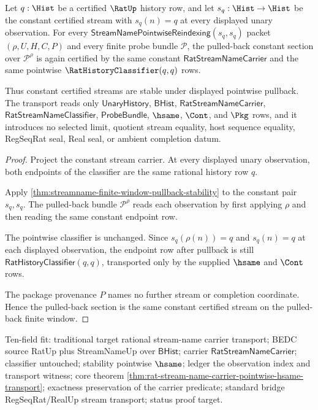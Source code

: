 \begin{theorem}
\label{thm:streamname-constant-section-transport}
Let $q:\Hist$ be a certified $\RatUp$ history row, and let $s_q:\Hist\to\Hist$ be the constant certified stream with $s_q(n)=q$ at every displayed unary observation. For every $\mathsf{StreamNamePointwiseReindexing}(s_q,s_q)$ packet $(\rho,U,H,C,P)$ and every finite probe bundle $\mathcal{P}$, the pulled-back constant section over $\mathcal{P}^{\rho}$ is again certified by the same constant $\mathsf{RatStreamNameCarrier}$ and the same pointwise $\RatHistoryClassifier(q,q)$ rows.

Thus constant certified streams are stable under displayed pointwise pullback. The transport reads only $\mathsf{UnaryHistory}$, $\mathsf{BHist}$, $\mathsf{RatStreamNameCarrier}$, $\mathsf{RatStreamNameClassifier}$, $\mathsf{ProbeBundle}$, $\hsame$, $\Cont$, and $\Pkg$ rows, and it introduces no selected limit, quotient stream equality, host sequence equality, RegSeqRat seal, Real seal, or ambient completion datum.
\end{theorem}
\begin{proof}
Project the constant stream carrier. At every displayed unary observation, both endpoints of the classifier are the same rational history row $q$.

Apply \autoref{thm:streamname-finite-window-pullback-stability} to the constant pair $s_q,s_q$. The pulled-back bundle $\mathcal{P}^{\rho}$ reads each observation by first applying $\rho$ and then reading the same constant endpoint row.

The pointwise classifier is unchanged. Since $s_q(\rho(n))=q$ and $s_q(n)=q$ at each displayed observation, the endpoint row after pullback is still $\mathsf{RatHistoryClassifier}(q,q)$, transported only by the supplied $\hsame$ and $\Cont$ rows.

The package provenance $P$ names no further stream or completion coordinate. Hence the pulled-back section is the same constant certified stream on the pulled-back finite window.
\end{proof}

Ten-field fit: traditional target rational stream-name carrier transport; BEDC
source RatUp plus StreamNameUp over $\mathsf{BHist}$; carrier
$\mathsf{RatStreamNameCarrier}$; classifier untouched; stability pointwise
$\hsame$; ledger the observation index and transport witness; core theorem
\autoref{thm:rat-stream-name-carrier-pointwise-hsame-transport}; exactness
preservation of the carrier predicate; standard bridge RegSeqRat/RealUp stream
transport; status proof target.


